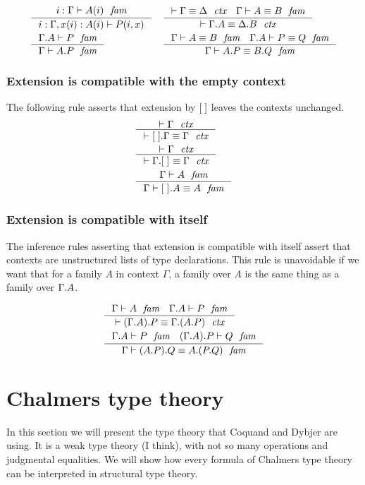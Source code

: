 \begin{align}
& \inference
  {\jvfam{i}{\Gamma}{A}}
  {\jvfamcombi{{i}{x}}{{\Gamma}{A}}{P}}
& & \inference
    {\jctxeq{\Gamma}{\Delta}
     \jfameq{\Gamma}{A}{B}}
    {\jctxeq{\ctxext{\Gamma}{A}}{\ctxext{\Delta}{B}}}\\
& \inference
  {\jfam{{\Gamma}{A}}{P}}
  {\jfam{\Gamma}{\ctxext{A}{P}}}
& & \inference
    {\jfameq{\Gamma}{A}{B}
     \jfameq{{\Gamma}{A}}{P}{Q}}
    {\jfameq{\Gamma}{\ctxext{A}{P}}{\ctxext{B}{Q}}}
\end{align}

\subsubsection{Extension is compatible with the empty context}
The following rule asserts that extension by ${[\;]}$ leaves the contexts unchanged.
\begin{align}
& \inference
  {\jctx{\Gamma}}
  {\jctxeq{\ctxext{\emptyc}{\Gamma}}{\Gamma}}\\
& \inference
  {\jctx{\Gamma}}
  {\jctxeq{\ctxext{\Gamma}{\emptyf}}{\Gamma}}\\
& \inference
  {\jfam{\Gamma}{A}}
  {\jfameq{\Gamma}{\ctxext{\emptyf}{A}}{A}}
\end{align}

\subsubsection{Extension is compatible with itself}\label{comp-ee}
The inference rules asserting that extension is compatible with itself assert
that contexts are unstructured lists of type declarations. This rule is
unavoidable if we want that for a family $A$ in context $\Gamma$, a family over
$A$ is the same thing as a family over $\ctxext{\Gamma}{A}$. 

\begin{align}
& \inference
  {\jfam{\Gamma}{A}
   \jfam{{\Gamma}{A}}{P}}
  {\jctxeq{\ctxext{{\Gamma}{A}}{P}}{\ctxext{\Gamma}{{A}{P}}}}\\
& \inference
  {\jfam{{\Gamma}{A}}{P}
   \jfam{{{\Gamma}{A}}{P}}{Q}}
  {\jfameq{\Gamma}{\ctxext{{A}{P}}{Q}}{\ctxext{A}{{P}{Q}}}}
\end{align}


\section{Chalmers type theory}
In this section we will present the type theory that Coquand and Dybjer are using.
It is a weak type theory (I think), with not so many operations and judgmental equalities.
We will show how every formula of Chalmers type theory can be interpreted in
structural type theory.
